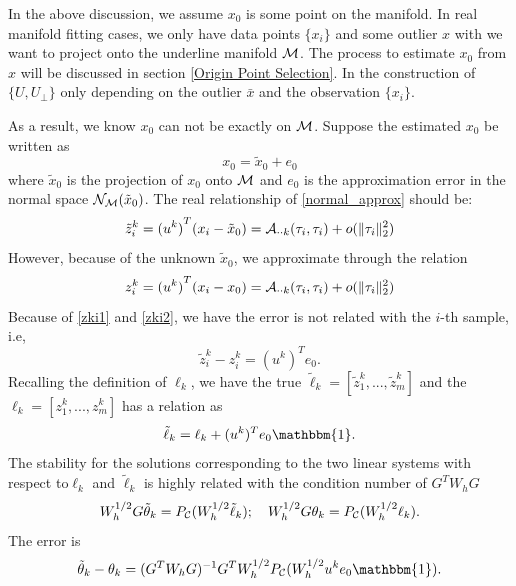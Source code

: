 \documentclass[aos,preprint]{imsart}
\newtheorem{assumption}[theorem]{Assumption}
\theoremstyle{remark}
\begin{document}
 In the above discussion, we assume $x_0$ is some point on the manifold. In real manifold fitting cases, we only have data points $\{x_i\}$ and some outlier $x$ with we want to project onto the underline manifold $\cal M$. The process to estimate $x_0$ from $x$ will be discussed in section
 \ref{Origin Point Selection}.  
In the construction of $\{U, U_\perp\}$ only depending on the outlier $\bar{x}$ and the observation $\{x_i\}$.
 
 As a result, we know $x_0$ can not be exactly on $\cal M$. Suppose the estimated $x_0$ be written as
 \[
 x_0 = \tilde{x}_0 +e_0 
 \]
 where $\tilde{x}_0$ is the projection of $x_0$ onto $\cal M$ and $e_0$ is the approximation error in the normal space ${\cal N}_{\cal M}(\tilde{x}_0)$. The real relationship of \eqref{normal_approx} should be:
 \begin{equation}\label{zki1}
 \tilde{z}_i^k =  {(u^k)}^T (x_i -\tilde{x}_0) 
={\cal A}_{\cdot\cdot k}(\tau_i,\tau_i) +  o(\|\tau_i\|_2^2)%
 \end{equation}
However, because of the unknown $\tilde{x}_0$, we approximate through the relation
\begin{equation}\label{zki2}
 z_i^k =  {(u^k)}^T (x_i -{x}_0) = {\cal A}_{\cdot\cdot k}(\tau_i,\tau_i)+  o(\|\tau_i\|_2^2)
\end{equation}
Because of \eqref{zki1} and \eqref{zki2}, we have the error is not related with the $i$-th sample, i.e,
\[
 \tilde{z}_i^k -z_i^k = (u^k)^T e_0.
\]
 Recalling the definition of $\ell_k$,  we have the true $\tilde{\ell}_k = [\tilde{z}_1^k,...,\tilde{z}_m^k]$ and the $\ell_k=[z_1^k,...,z_m^k]$ has a relation as
 \[
 \tilde{\ell}_k = \ell_k + (u^k)^T e_0 {\mathbbm{1}}.
 \]
 The stability for the solutions corresponding to the two linear systems  with respect to$\ell_k$ and $\tilde{\ell}_k$ is highly related with the condition number of $G^T W_h G$
 \[
 W_h^{1/2}G \tilde{\theta}_k  =  P_{\cal C} (W_h^{1/2}\tilde{\ell}_k);\quad W_h^{1/2}G \theta_k  =  P_{\cal C} (W_h^{1/2}\ell_k).
 \]
 The error is
 \[
 \tilde{\theta}_k -\theta_k = (G^T W_h G)^{-1} G^T W_h^{1/2} P_{\cal C} ( W_h^{1/2}u^k e_0 {\mathbbm{1}}).
 \]
\end{document}
